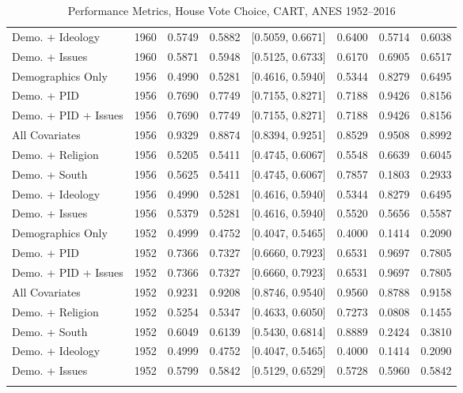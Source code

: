 \begin{longtable}{lrrrlrrr}
  Demo. + Ideology & 1960 & 0.5749 & 0.5882 & [0.5059, 0.6671] & 0.6400 & 0.5714 & 0.6038 \\ 
  Demo. + Issues & 1960 & 0.5871 & 0.5948 & [0.5125, 0.6733] & 0.6170 & 0.6905 & 0.6517 \\ 
  Demographics Only & 1956 & 0.4990 & 0.5281 & [0.4616, 0.5940] & 0.5344 & 0.8279 & 0.6495 \\ 
  Demo. + PID & 1956 & 0.7690 & 0.7749 & [0.7155, 0.8271] & 0.7188 & 0.9426 & 0.8156 \\ 
  Demo. + PID + Issues & 1956 & 0.7690 & 0.7749 & [0.7155, 0.8271] & 0.7188 & 0.9426 & 0.8156 \\ 
  All Covariates & 1956 & 0.9329 & 0.8874 & [0.8394, 0.9251] & 0.8529 & 0.9508 & 0.8992 \\ 
  Demo. + Religion & 1956 & 0.5205 & 0.5411 & [0.4745, 0.6067] & 0.5548 & 0.6639 & 0.6045 \\ 
  Demo. + South & 1956 & 0.5625 & 0.5411 & [0.4745, 0.6067] & 0.7857 & 0.1803 & 0.2933 \\ 
  Demo. + Ideology & 1956 & 0.4990 & 0.5281 & [0.4616, 0.5940] & 0.5344 & 0.8279 & 0.6495 \\ 
  Demo. + Issues & 1956 & 0.5379 & 0.5281 & [0.4616, 0.5940] & 0.5520 & 0.5656 & 0.5587 \\ 
  Demographics Only & 1952 & 0.4999 & 0.4752 & [0.4047, 0.5465] & 0.4000 & 0.1414 & 0.2090 \\ 
  Demo. + PID & 1952 & 0.7366 & 0.7327 & [0.6660, 0.7923] & 0.6531 & 0.9697 & 0.7805 \\ 
  Demo. + PID + Issues & 1952 & 0.7366 & 0.7327 & [0.6660, 0.7923] & 0.6531 & 0.9697 & 0.7805 \\ 
  All Covariates & 1952 & 0.9231 & 0.9208 & [0.8746, 0.9540] & 0.9560 & 0.8788 & 0.9158 \\ 
  Demo. + Religion & 1952 & 0.5254 & 0.5347 & [0.4633, 0.6050] & 0.7273 & 0.0808 & 0.1455 \\ 
  Demo. + South & 1952 & 0.6049 & 0.6139 & [0.5430, 0.6814] & 0.8889 & 0.2424 & 0.3810 \\ 
  Demo. + Ideology & 1952 & 0.4999 & 0.4752 & [0.4047, 0.5465] & 0.4000 & 0.1414 & 0.2090 \\ 
  Demo. + Issues & 1952 & 0.5799 & 0.5842 & [0.5129, 0.6529] & 0.5728 & 0.5960 & 0.5842 \\ 
   \bottomrule
\caption{Performance Metrics, House Vote Choice, CART, ANES 1952--2016} 
\label{tab:ANES_house_cart}
\end{longtable}
